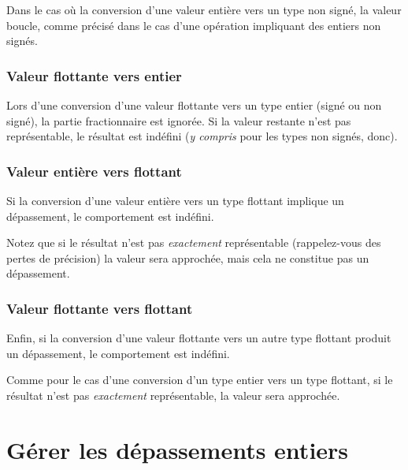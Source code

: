 Dans le cas où la conversion d'une valeur entière vers un type non
signé, la valeur boucle, comme précisé dans le cas d'une opération
impliquant des entiers non signés.

\subsubsection{Valeur flottante vers entier}
\label{valeur-flottante-vers-entier}

Lors d'une conversion d'une valeur flottante vers un type entier (signé
ou non signé), la partie fractionnaire est ignorée. Si la valeur
restante n'est pas représentable, le résultat est indéfini (\emph{y
compris} pour les types non signés, donc).

\subsubsection{Valeur entière vers flottant}
\label{valeur-entiere-vers-flottant}

Si la conversion d'une valeur entière vers un type flottant implique un
dépassement, le comportement est indéfini.

\begin{infobox}
  Notez que si le résultat n'est pas
\emph{exactement} représentable (rappelez-vous des pertes de précision)
la valeur sera approchée, mais cela ne constitue pas un dépassement.
\end{infobox}


\subsubsection{Valeur flottante vers flottant}
\label{valeur-flottante-vers-flottant}

Enfin, si la conversion d'une valeur flottante vers un autre type
flottant produit un dépassement, le comportement est indéfini.

\begin{infobox}
 Comme pour le cas d'une conversion
d'un type entier vers un type flottant, si le résultat n'est pas
\emph{exactement} représentable, la valeur sera approchée.
\end{infobox}

\section{Gérer les dépassements entiers}
\label{gerer-les-dépassements-entiers }

